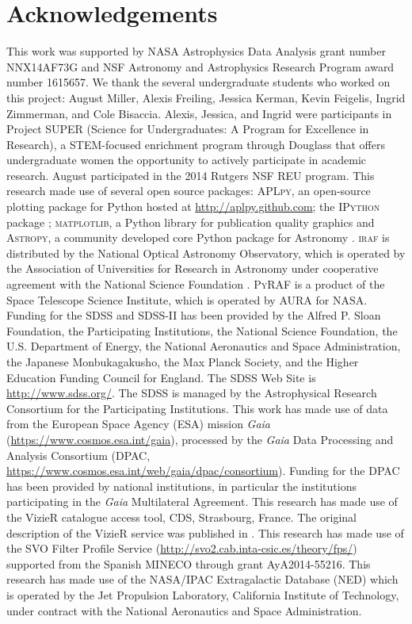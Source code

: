\documentclass[apj, revtex4-1]{emulateapj}
\begin{document}
\section*{Acknowledgements}
This work was supported by NASA Astrophysics Data Analysis grant number NNX14AF73G and NSF Astronomy and Astrophysics Research Program award number 1615657. We thank the several undergraduate students who worked on this project: August Miller, Alexis Freiling, Jessica Kerman, Kevin Feigelis, Ingrid Zimmerman, and Cole Bisaccia. Alexis, Jessica, and Ingrid were participants in Project SUPER (Science for Undergraduates: A Program for Excellence in Research), a STEM-focused enrichment program through Douglass that offers undergraduate women the opportunity to actively participate in academic research.  August participated in the 2014 Rutgers NSF REU program.
This research made use of several open source packages: \textsc{APLpy}, an open-source plotting package for Python hosted at \url{http://aplpy.github.com}; the \textsc{IPython} package \citep{Perez2007}; \textsc{matplotlib}, a Python library for publication quality graphics \citep{Hunter2007} and \textsc{Astropy}, a community developed core Python package for Astronomy \citep{TheAstropyCollaboration2013}.
\textsc{iraf} is distributed by the National Optical Astronomy Observatory, which is operated by the Association of Universities for Research in Astronomy under cooperative agreement with the National Science Foundation \citep{Tody1993}.
\textsc{PyRAF} is a product of the Space Telescope Science Institute, which is operated by AURA for NASA.
Funding for the SDSS and SDSS-II has been provided by the Alfred P. Sloan Foundation, the Participating Institutions, the National Science Foundation, the U.S. Department of Energy, the National Aeronautics and Space Administration, the Japanese Monbukagakusho, the Max Planck Society, and the Higher Education Funding Council for England. The SDSS Web Site is \url{http://www.sdss.org/}. The SDSS is managed by the Astrophysical Research Consortium for the Participating Institutions.
This work has made use of data from the European Space Agency (ESA) mission \textit{Gaia} (\url{https://www.cosmos.esa.int/gaia}), processed by the \textit{Gaia} Data Processing and Analysis Consortium (DPAC, \url{https://www.cosmos.esa.int/web/gaia/dpac/consortium}). Funding for the DPAC has been provided by national institutions, in particular the institutions participating in the \textit{Gaia} Multilateral Agreement.
This research has made use of the VizieR catalogue access tool, CDS, Strasbourg, France. The original description of the VizieR service was published in \cite{Ochsenbein2000}.
This research has made use of the SVO Filter Profile Service (\url{http://svo2.cab.inta-csic.es/theory/fps/}) supported from the Spanish MINECO through grant AyA2014-55216.
This research has made use of the NASA/IPAC Extragalactic Database (NED) which is operated by the Jet Propulsion Laboratory, California Institute of Technology, under contract with the National Aeronautics and Space Administration.




\end{document}
